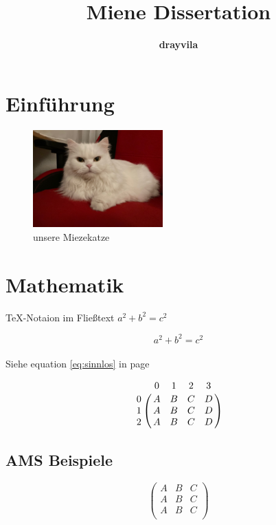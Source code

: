 \documentclass[ngerman,12pt]{scrreprt}
\author{\textbf{drayvila}}
\title{Miene Dissertation}
\begin{document}
\maketitle

\tableofcontents

\listoftables

\listoffigures



\chapter{Einführung}

\blindtext




\begin{figure} [b]
\begin{center}
\includegraphics[width=5cm]{Katze2}
\caption{unsere Miezekatze}\label{fig:katze}
\end{center}
\end{figure}

\chapter{Mathematik}
TeX-Notaion im Fließtext $a^2 + b^2 = c^2$


\[a^2 + b^2 = c^2\] \\

Siehe equation \ref{eq:sinnlos} in page \pageref{eq:sinnlos}


\[
\bordermatrix{%
  & 0 & 1 & 2 & 3\cr
 0 & A & B & C & D\cr
 1 & A & B & C & D\cr
 2 & A & B & C & D\cr
}
\]



\section{AMS Beispiele}

\begin{equation} \label{eq:sinnlos}
\begin{pmatrix}
A & B & C \\
A & B & C \\
A & B & C \\
\end{pmatrix}
\end{equation}
\end{document}
